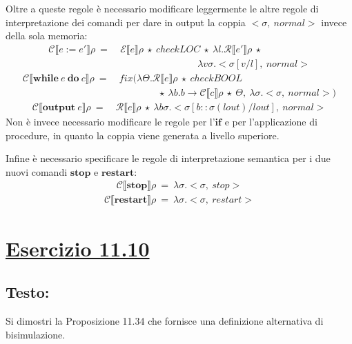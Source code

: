 \documentclass[a4paper,twosides]{report}
\newcommand{\sectionline}{
  \begin{center}
    \resizebox{0.5\linewidth}{5ex}{
      \begin{tikzpicture}
        \node  (C) at (0,0) {};
        \node (D) at (10,0) {};
        \path (C) to [ornament=84] (D);
      \end{tikzpicture}
    }
  \end{center}
}
\begin{document}
Oltre a queste regole \`e necessario modificare leggermente le altre regole
di interpretazione dei comandi per dare in output la coppia $<\sigma,\
normal>$ invece della sola memoria:
\begin{align*}
  \mathcal{C}\llbracket e:=e'\rrbracket\rho\ =\ &\mathcal{E}\llbracket
  e\rrbracket\rho\ \star\ checkLOC\ \star\ \lambda
  l.\mathcal{R}\llbracket e'\rrbracket\rho\ \star\\
  &\qquad\qquad\qquad\qquad\lambda
  v\sigma.<\sigma[v/l],\ normal>
\end{align*}
\begin{align*}
  \mathcal{C}\llbracket\mathbf{while}\ e\ \mathbf{do}\ c\rrbracket\rho\
  =\ &fix(\lambda\Theta.\mathcal{R}\llbracket e\rrbracket\rho\ \star\
  checkBOOL\\
  &\qquad\qquad\star\ \lambda b.b\rightarrow\mathcal{C}\llbracket
  c\rrbracket\rho\ \star\ \Theta,\ \lambda\sigma.<\sigma,\ normal>)
\end{align*}
\begin{align*}
  \mathcal{C}\llbracket\mathbf{output}\ e\rrbracket\rho\ =\ 
  &\mathcal{R}\llbracket e\rrbracket\rho\ \star\ \lambda
  b\sigma.<\sigma[b::\sigma(lout)/lout],\ normal>
\end{align*}
Non \`e invece necessario modificare le regole per l'$\mathbf{if}$ e
per l'applicazione di procedure, in quanto la coppia viene generata a
livello superiore.

Infine \`e necessario specificare le regole di interpretazione
semantica per i due nuovi comandi $\mathbf{stop}$ e
$\mathbf{restart}$:
\begin{align*}
  \mathcal{C}\llbracket\mathbf{stop}\rrbracket\rho\ =\
  \lambda\sigma.<\sigma,\ stop>
\end{align*}
\begin{align*}
  \mathcal{C}\llbracket\mathbf{restart}\rrbracket\rho\ =\
  \lambda\sigma.<\sigma,\ restart>
\end{align*}

\sectionline
\section*{\hyperref[toc]{Esercizio 11.10}}
\subsection*{Testo:}
Si dimostri la Proposizione 11.34 che fornisce una definizione
alternativa di bisimulazione.
\end{document}
